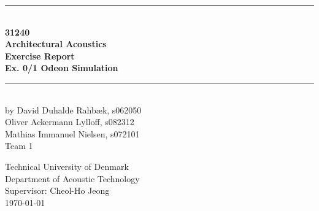 \begin{titlepage}
\centering \parindent=0pt
\newcommand{\HRule}{\rule{\textwidth}{1mm}}
 \HRule\\[1cm]\Huge\bfseries
31240\\Architectural Acoustics\\Exercise Report\\[0.7cm]
\large Ex. 0/1 Odeon Simulation\\[1cm]
\HRule\\[4cm]  \large by David Duhalde Rahbæk, s062050\\
Oliver Ackermann Lylloff, s082312\\
Mathias Immanuel Nielsen, s072101\\
Team 1\\
 \normalsize %
\begin{flushleft}
Technical University of Denmark\\
Department of Acoustic Technology\\
Supervisor: Cheol-Ho Jeong\\
\today \end{flushleft}
\end{titlepage}
